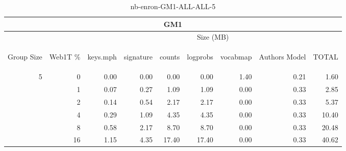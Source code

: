 \begin{center}
\begin{table}[htbp] 
 \begin{center}
\begin{tabular}{ | r | r | r | r | r | r | r | r | r |}
\hline
\multicolumn{9}{|c|}{GM1}\\
\hline
 & & \multicolumn{7}{|c|}{Size (MB)}\\ \cline{3-9}
\begin{sideways}Group Size\end{sideways} & \begin{sideways}Web1T \% \end{sideways} & \begin{sideways}keys.mph\end{sideways} & \begin{sideways}signature\end{sideways} & \begin{sideways}counts\end{sideways} & \begin{sideways}logprobs\end{sideways} & \begin{sideways}vocabmap\end{sideways} & \begin{sideways}Authors Model \end{sideways} & \begin{sideways}TOTAL\end{sideways}\\
\hline
\multirow{5}{*}{5}
 & 0 & 0.00 & 0.00 & 0.00 & 0.00 & 1.40 & 0.21 & 1.60\\ \cline{2-9}
 & 1 & 0.07 & 0.27 & 1.09 & 1.09 & 0.00 & 0.33 & 2.85\\ \cline{2-9}
 & 2 & 0.14 & 0.54 & 2.17 & 2.17 & 0.00 & 0.33 & 5.37\\ \cline{2-9}
 & 4 & 0.29 & 1.09 & 4.35 & 4.35 & 0.00 & 0.33 & 10.40\\ \cline{2-9}
 & 8 & 0.58 & 2.17 & 8.70 & 8.70 & 0.00 & 0.33 & 20.48\\ \cline{2-9}
 & 16 & 1.15 & 4.35 & 17.40 & 17.40 & 0.00 & 0.33 & 40.62\\ \cline{2-9}
\hline
\end{tabular}
\caption{nb-enron-GM1-ALL-ALL-5}
\label{table:nb-enron-GM1-ALL-ALL-5}
\end{center}
 \end{table}
\end{center}

